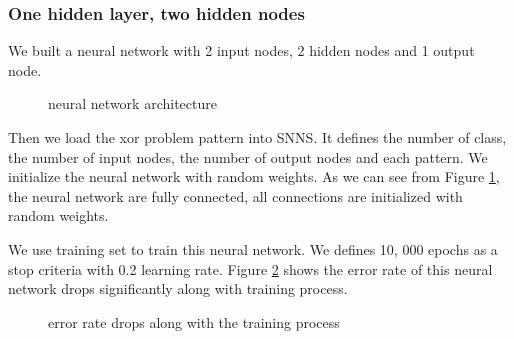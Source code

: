 \documentclass[11pt, a4paper, oneside, openright]{article}
\begin{document}
\subsubsection{One hidden layer, two hidden nodes}
We built a neural network with 2 input nodes, 2 hidden nodes and 1 output node.
  \begin{figure}[!ht]
  \centerline{}
  \caption{neural network architecture}
  \label{fig:neural}
  \end{figure}

Then we load the xor problem pattern into SNNS. It  defines the number of class, the number of input nodes, the number of output nodes and each pattern. We initialize the neural network with random weights.  As we can see from Figure \ref{fig:neural}, the neural network are fully connected,  all connections are initialized with random weights.

We use training set to train this neural network. We defines 10, 000 epochs as a stop criteria with 0.2 learning rate. Figure 
\ref{fig:errorate} shows the  error rate of  this neural network drops significantly along with training process.
  \begin{figure}[!ht]
  \centerline{}
  \caption{error rate drops along with the training process}
  \label{fig:errorate}
  \end{figure}
\end{document}
